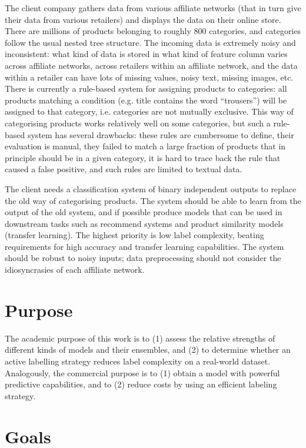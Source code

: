 The client company gathers data from various affiliate networks (that in turn give their data from various retailers) and displays the data on their online store.
There are millions of products belonging to roughly 800 categories, and categories follow the usual nested tree structure.
The incoming data is extremely noisy and inconsistent: what kind of data is stored in what kind of feature column varies across affiliate networks, across retailers within an affiliate network, and the data within a retailer can have lots of missing values, noisy text, missing images, etc.
There is currently a rule-based system for assigning products to categories: all products matching a condition (e.g. title contains the word ``trousers'') will be assigned to that category, i.e. categories are not mutually exclusive.
This way of categorising products works relatively well on some categories, but such a rule-based system has several drawbacks: these rules are cumbersome to define, their evaluation is manual, they failed to match a large fraction of products that in principle should be in a given category, it is hard to trace back the rule that caused a false positive, and such rules are limited to textual data.

The client needs a classification system of binary independent outputs to replace the old way of categorising products.
The system should be able to learn from the output of the old system, and if possible produce models that can be used in downstream tasks such as recommend systems and product similarity models (transfer learning).
The highest priority is low label complexity, beating requirements for high accuracy and transfer learning capabilities.
The system should be robust to  noisy inputs; data preprocessing should not consider the idiosyncrasies of each affiliate network.

\section{Purpose}

The academic purpose of this work is to (1) assess the relative strengths of different kinds of models and their ensembles, and (2) to determine whether an active labelling strategy reduces label complexity on a real-world dataset. Analogously, the commercial purpose is to (1) obtain a model with powerful predictive capabilities, and to (2) reduce costs by using an efficient labeling strategy.

\section{Goals}

